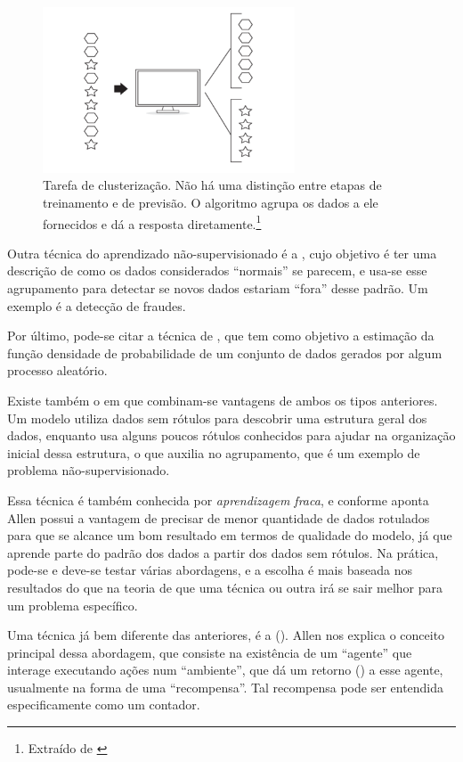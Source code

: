 \begin{figure}[htb]
\centering
\includegraphics[width=7.5cm]{figuras/clustering}
\caption{Tarefa de clusterização. Não há uma distinção entre etapas de treinamento e de previsão. O algoritmo agrupa os dados a ele fornecidos e dá a resposta diretamente.\footnote{Extraído de \citep{allen}}}
\label{fig:clustering}
\end{figure}

Outra técnica do aprendizado não-supervisionado é a , cujo objetivo é ter uma descrição de como os dados considerados ``normais'' se parecem, e usa-se esse agrupamento para detectar se novos dados estariam ``fora'' desse padrão. Um exemplo é a detecção de fraudes.

Por último, pode-se citar a técnica de , que tem como objetivo a estimação da função densidade de probabilidade de um conjunto de dados gerados por algum processo aleatório.

Existe também o  em que combinam-se vantagens de ambos os tipos anteriores. Um modelo utiliza dados sem rótulos para descobrir uma estrutura geral dos dados, enquanto usa alguns poucos rótulos conhecidos para ajudar na organização inicial dessa estrutura, o que auxilia no agrupamento, que é um exemplo de problema não-supervisionado.

Essa técnica é também conhecida por \emph{aprendizagem fraca}, e conforme aponta Allen \citep{allen} possui a vantagem de precisar de menor quantidade de dados rotulados para que se alcance um bom resultado em termos de qualidade do modelo, já que aprende parte do padrão dos dados a partir dos dados sem rótulos. Na prática, pode-se e deve-se testar várias abordagens, e a escolha é mais baseada nos resultados do que na teoria de que uma técnica ou outra irá se sair melhor para um problema específico.

Uma técnica já bem diferente das anteriores, é a  (). Allen \citep{allen} nos explica o conceito principal dessa abordagem, que consiste na existência de um ``agente'' que interage executando ações num ``ambiente'', que dá um retorno () a esse agente, usualmente na forma de uma ``recompensa''. Tal recompensa pode ser entendida especificamente como um contador. 


